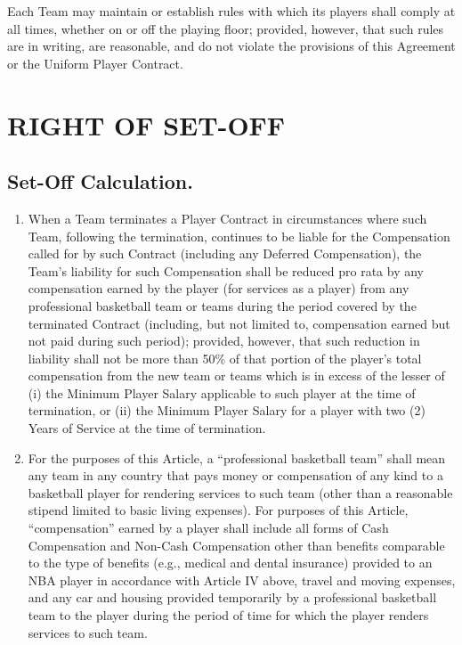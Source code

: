 \documentclass[
]{book}
\providecommand{\tightlist}{%
  \setlength{\itemsep}{0pt}\setlength{\parskip}{0pt}}
\begin{document}
Each Team may maintain or establish rules with which its players shall comply at all times, whether on or off the playing floor; provided, however, that such rules are in writing, are reasonable, and do not violate the provisions of this Agreement or the Uniform Player Contract.

\hypertarget{right-of-set-off}{%
\chapter{RIGHT OF SET-OFF}\label{right-of-set-off}}

\hypertarget{set-off-calculation.}{%
\section{Set-Off Calculation.}\label{set-off-calculation.}}

\begin{enumerate}
\def\labelenumi{(\alph{enumi})}
\tightlist
\item
  When a Team terminates a Player Contract in circumstances where such Team, following the termination, continues to be liable for the Compensation called for by such Contract (including any Deferred Compensation), the Team's liability for such Compensation shall be reduced pro rata by any compensation earned by the player (for services as a player) from any professional basketball team or teams during the period covered by the terminated Contract (including, but not limited to, compensation earned but not paid during such period); provided, however, that such reduction in liability shall not be more than 50\% of that portion of the player's total compensation from the new team or teams which is in excess of the lesser of (i) the Minimum Player Salary applicable to such player at the time of termination, or (ii) the Minimum Player Salary for a player with two (2) Years of Service at the time of termination.
\item
  For the purposes of this Article, a ``professional basketball team'' shall mean any team in any country that pays money or compensation of any kind to a basketball player for rendering services to such team (other than a reasonable stipend limited to basic living expenses). For purposes of this Article, ``compensation'' earned by a player shall include all forms of Cash Compensation and Non-Cash Compensation other than benefits comparable to the type of benefits (e.g., medical and dental insurance) provided to an NBA player in accordance with Article IV above, travel and moving expenses, and any car and housing provided temporarily by a professional basketball team to the player during the period of time for which the player renders services to such team.
\end{enumerate}
\end{document}
